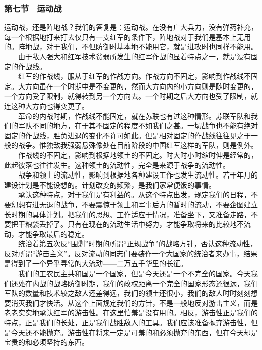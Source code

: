 \documentclass[cn,11pt,chinese]{elegantbook}
\def\myformat#1{\hfil\hfil #1}
\begin{document}
\subsubsection*{\myformat{第七节　运动战}}
运动战，还是阵地战？我们的答复是：运动战。在没有广大兵力，没有弹药补充，每一个根据地打来打去仅只有一支红军的条件下，阵地战对于我们是基本上无用的。阵地战，对于我们，不但防御时基本地不能用它，就是进攻时也同样不能用。\\
　　由于敌人强大和红军技术贫弱所发生的红军作战的显着特点之一，就是没有固定的作战线。\\
　　红军的作战线，服从于红军的作战方向。作战方向不固定，影响到作战线不固定。大方向虽在一个时期中是不变更的，然而大方向内的小方向则是随时变更的，一个方向受了限制，就得转到另一个方向去。一个时期之后大方向也受了限制，就连这种大方向也得变更了。\\
　　革命的内战时期，作战线不能固定，就在苏联也有过这种情形。苏联军队和我们的军队不同的地方，在于其不固定的程度不如我们之甚。一切战争也不能有绝对固定的作战线，胜负进退的变化不许可如此。但是相对固定的作战线往往见之于一般的战争。惟独敌我强弱悬殊像处在目前阶段的中国红军这样的军队，则是例外。\\
　　作战线的不固定，影响到根据地领土的不固定。时大时小时缩时伸是经常的，此起彼落也往往发生。这种领土的流动性，完全是来源于战争的流动性。\\
　　战争和领土的流动性，影响到根据地各种建设工作也发生流动性。若干年月的建设计划是不能设想的。计划改变的频繁，是我们家常便饭的事情。\\
　　承认这种特点，对于我们是有利益的。从这个特点出发，规定我们的日程，不要幻想有进无退的战争，不要震惊于领土和军事后方的暂时的流动，不要企图建立长时期的具体计划。把我们的思想、工作适应于情况，准备坐下，又准备走路，不要把干粮袋丢掉了。只有在现在的流动生活中努力，才能争取将来的比较地不流动，才能争取最后的稳定。\\
　　统治着第五次反“围剿”时期的所谓“正规战争”的战略方针，否认这种流动性，反对所谓“游击主义”。反对流动的同志们要装作一个大国家的统治者来办事，结果是得到了一个异乎寻常的大流动——二万五千华里的长征。\\
　　我们的工农民主共和国是一个国家，但是今天还是一个不完全的国家。今天我们还处在内战的战略防御时期，我们的政权距离一个完全的国家形态还很远，我们军队的数量和技术较之敌人还差得远，我们的领土还很小，我们的敌人时时刻刻想要消灭我们才快活。从这个上面规定我们的方针，不是一般地反对游击主义，而是老老实实地承认红军的游击性。在这里怕羞是没有用的。相反，游击性正是我们的特点，正是我们的长处，正是我们战胜敌人的工具。我们应该准备抛弃游击性，但是今天还不能抛弃。游击性在将来一定是可羞的和必须抛弃的东西，但在今天却是宝贵的和必须坚持的东西。\\
\end{document}
